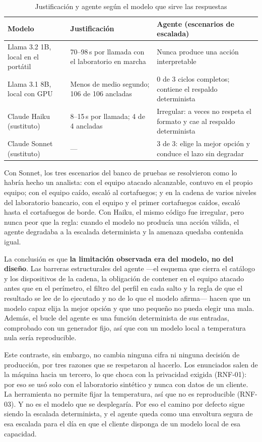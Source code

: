 \begin{table}[H]
  \centering
  \caption{Justificación y agente según el modelo que sirve las respuestas}
  \label{tab:contraste-claude}
  \begin{tabular}{@{}p{}p{}p{}@{}}
    \toprule
    \textbf{Modelo} & \textbf{Justificación} & \textbf{Agente (escenarios de escalada)} \\
    \midrule
    Llama 3.2 1B, local en el portátil & 70--98\,s por llamada con el laboratorio en marcha & Nunca produce una acción interpretable \\
    Llama 3.1 8B, local con GPU & Menos de medio segundo; 106 de 106 ancladas & 0 de 3 ciclos completos; contiene el respaldo determinista \\
    Claude Haiku (sustituto) & 8--15\,s por llamada; 4 de 4 ancladas & Irregular: a veces no respeta el formato y cae al respaldo determinista \\
    Claude Sonnet (sustituto) & --- & 3 de 3: elige la mejor opción y conduce el lazo sin degradar \\
    \bottomrule
  \end{tabular}
\end{table}

Con Sonnet, los tres escenarios del banco de pruebas se resolvieron como lo habría hecho un analista:
con el equipo atacado alcanzable, contuvo en el propio equipo; con el equipo caído, escaló al
cortafuegos; y en la cadena de varios niveles del laboratorio bancario, con el equipo y el primer
cortafuegos caídos, escaló hasta el cortafuegos de borde. Con Haiku, el mismo código fue irregular,
pero nunca peor que la regla: cuando el modelo no producía una acción válida, el agente degradaba a la
escalada determinista y la amenaza quedaba contenida igual.

La conclusión es que \textbf{la limitación observada era del modelo, no del diseño}. Las barreras
estructurales del agente ---el esquema que cierra el catálogo y los dispositivos de la cadena, la
obligación de contener en el equipo atacado antes que en el perímetro, el filtro del perfil en cada
salto y la regla de que el resultado se lee de lo ejecutado y no de lo que el modelo afirma--- hacen
que un modelo capaz elija la mejor opción y que uno pequeño no pueda elegir una mala. Además, el bucle
del agente es una función determinista de sus entradas, comprobado con un generador fijo, así que con
un modelo local a temperatura nula sería reproducible.

Este contraste, sin embargo, no cambia ninguna cifra ni ninguna decisión de producción, por tres
razones que se respetaron al hacerlo. Los enunciados salen de la máquina hacia un tercero, lo que
choca con la privacidad exigida (RNF-01): por eso se usó solo con el laboratorio sintético y nunca
con datos de un cliente. La herramienta no permite fijar la temperatura, así que no es reproducible
(RNF-03). Y no es el modelo que se desplegaría. Por eso el camino por defecto sigue siendo la
escalada determinista, y el agente queda como una envoltura segura de esa escalada para el día en
que el cliente disponga de un modelo local de esa capacidad.

